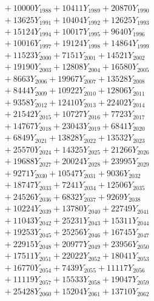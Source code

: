 \documentclass[a4paper,10pt]{article}
\begin{document}
{\begin{align}
&\;  + 10000 Y_{1988} + 10411 Y_{1989} + 20870 Y_{1990} \\[0.3ex]
&\;  + 13625 Y_{1991} + 10404 Y_{1992} + 12625 Y_{1993} \\[0.3ex]
&\;  + 15124 Y_{1994} + 10017 Y_{1995} + 9640 Y_{1996} \\[0.3ex]
&\;  + 10016 Y_{1997} + 19124 Y_{1998} + 14864 Y_{1999} \\[0.3ex]
&\;  + 11523 Y_{2000} + 7151 Y_{2001} + 14521 Y_{2002} \\[0.3ex]
&\;  + 19190 Y_{2003} + 12808 Y_{2004} + 16580 Y_{2005} \\[0.3ex]
&\;  + 8663 Y_{2006} + 19967 Y_{2007} + 13528 Y_{2008} \\[0.5ex]\allowbreak
&\;  + 8444 Y_{2009} + 10922 Y_{2010} + 12806 Y_{2011} \\[0.3ex]
&\;  + 9358 Y_{2012} + 12410 Y_{2013} + 22402 Y_{2014} \\[0.3ex]
&\;  + 21542 Y_{2015} + 10727 Y_{2016} + 7723 Y_{2017} \\[0.3ex]
&\;  + 14767 Y_{2018} + 23043 Y_{2019} + 6841 Y_{2020} \\[0.3ex]
&\;  + 6849 Y_{2021} + 13828 Y_{2022} + 13532 Y_{2023} \\[0.3ex]
&\;  + 25570 Y_{2024} + 14325 Y_{2025} + 21266 Y_{2026} \\[0.3ex]
&\;  + 19688 Y_{2027} + 20024 Y_{2028} + 23995 Y_{2029} \\[0.3ex]
&\;  + 9271 Y_{2030} + 10547 Y_{2031} + 9036 Y_{2032} \\[0.3ex]
&\;  + 18747 Y_{2033} + 7241 Y_{2034} + 12506 Y_{2035} \\[0.3ex]
&\;  + 24526 Y_{2036} + 6832 Y_{2037} + 9269 Y_{2038} \\[0.5ex]\allowbreak
&\;  + 10224 Y_{2039} + 13780 Y_{2040} + 22749 Y_{2041} \\[0.3ex]
&\;  + 11043 Y_{2042} + 25231 Y_{2043} + 15311 Y_{2044} \\[0.3ex]
&\;  + 19253 Y_{2045} + 25256 Y_{2046} + 16745 Y_{2047} \\[0.3ex]
&\;  + 22915 Y_{2048} + 20977 Y_{2049} + 23956 Y_{2050} \\[0.3ex]
&\;  + 17511 Y_{2051} + 22022 Y_{2052} + 18041 Y_{2053} \\[0.3ex]
&\;  + 16770 Y_{2054} + 7439 Y_{2055} + 11117 Y_{2056} \\[0.3ex]
&\;  + 11119 Y_{2057} + 15533 Y_{2058} + 19047 Y_{2059} \\[0.3ex]
&\;  + 25428 Y_{2060} + 15204 Y_{2061} + 13710 Y_{2062} \\[0.3ex]

\end{align}}
\end{document}
